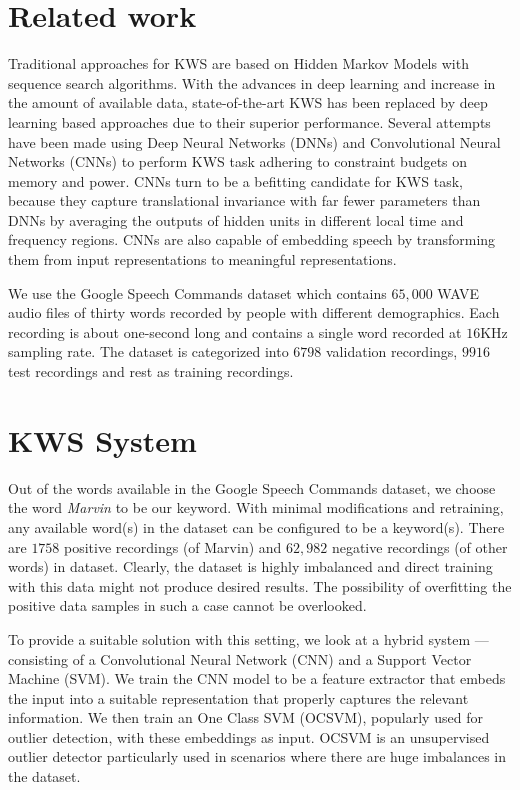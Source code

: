 \documentclass[a4paper]{article}
\begin{document}
\section{Related work}

Traditional approaches for KWS are based on Hidden Markov Models with sequence search algorithms. With the advances in deep learning and increase in the amount of available data, state-of-the-art KWS has been replaced by deep learning based approaches due to their superior performance\cite{6854370}. Several attempts have been made using Deep Neural Networks (DNNs) and Convolutional Neural Networks (CNNs) to perform KWS task adhering to constraint budgets on memory and power\cite{Tabibian}. CNNs turn to be a befitting candidate for KWS task, because they capture translational invariance with far fewer parameters than DNNs by averaging the outputs of hidden units in different local time and frequency regions\cite{Sainath2015}. CNNs are also capable of embedding speech by transforming them from input representations to meaningful representations\cite{8639036}. 

We use the Google Speech Commands dataset which contains $65,000$ WAVE audio files of thirty words recorded by people with different demographics\cite{gsc}. Each recording is about one-second long and contains a single word recorded at $16$KHz sampling rate. The dataset is categorized into $6798$ validation recordings, $9916$ test recordings and rest as training recordings.


\section{KWS System}

Out of the words available in the Google Speech Commands dataset, we choose the word \textit{Marvin} to be our keyword. With minimal modifications and retraining, any available word(s) in the dataset can be configured to be a keyword(s). There are $1758$ positive recordings (of Marvin) and $62,982$ negative recordings (of other words) in dataset. Clearly, the dataset is highly imbalanced and direct training with this data might not produce desired results. The possibility of overfitting the positive data samples in such a case cannot be overlooked.

To provide a suitable solution with this setting, we look at a hybrid system --- consisting of a Convolutional Neural Network (CNN) and a Support Vector Machine (SVM). We train the CNN model to be a feature extractor that embeds the input into a suitable representation that properly captures the relevant information. We then train an One Class SVM (OCSVM), popularly used for outlier detection, with these embeddings as input. OCSVM is an unsupervised outlier detector particularly used in scenarios where there are huge imbalances in the dataset.
\end{document}
